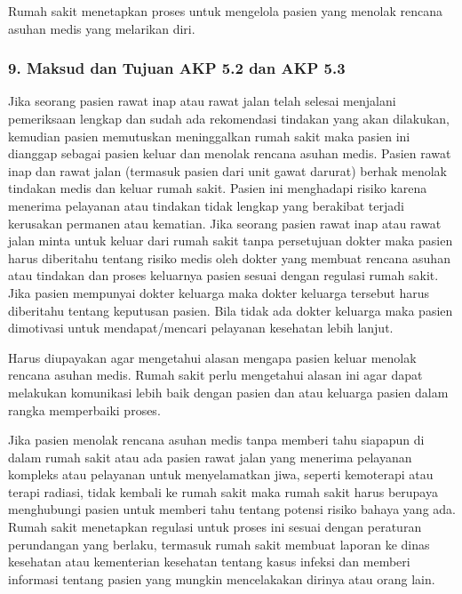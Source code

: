 \documentclass[
]{book}
\begin{document}
Rumah sakit menetapkan proses untuk mengelola pasien yang menolak rencana asuhan medis yang melarikan diri.

\hypertarget{maksud-dan-tujuan-akp-5.2-dan-akp-5.3}{%
\subsubsection*{9. Maksud dan Tujuan AKP 5.2 dan AKP 5.3}\label{maksud-dan-tujuan-akp-5.2-dan-akp-5.3}}

Jika seorang pasien rawat inap atau rawat jalan telah selesai menjalani pemeriksaan lengkap dan sudah ada rekomendasi tindakan yang akan dilakukan, kemudian pasien memutuskan meninggalkan rumah sakit maka pasien ini dianggap sebagai pasien keluar dan menolak rencana asuhan medis. Pasien rawat inap dan rawat jalan (termasuk pasien dari unit gawat darurat) berhak menolak tindakan medis dan keluar rumah sakit. Pasien ini menghadapi risiko karena menerima pelayanan atau tindakan tidak lengkap yang berakibat terjadi kerusakan permanen atau kematian. Jika seorang pasien rawat inap atau rawat jalan minta untuk keluar dari rumah sakit tanpa persetujuan dokter maka pasien harus diberitahu tentang risiko medis oleh dokter yang membuat rencana asuhan atau tindakan dan proses keluarnya pasien sesuai dengan regulasi rumah sakit. Jika pasien mempunyai dokter keluarga maka dokter keluarga tersebut harus diberitahu tentang keputusan pasien. Bila tidak ada dokter keluarga maka pasien dimotivasi untuk mendapat/mencari pelayanan kesehatan lebih lanjut.

Harus diupayakan agar mengetahui alasan mengapa pasien keluar menolak rencana asuhan medis. Rumah sakit perlu mengetahui alasan ini agar dapat melakukan komunikasi lebih baik dengan pasien dan atau keluarga pasien dalam rangka memperbaiki proses.

Jika pasien menolak rencana asuhan medis tanpa memberi tahu siapapun di dalam rumah sakit atau ada pasien rawat jalan yang menerima pelayanan kompleks atau pelayanan untuk menyelamatkan jiwa, seperti kemoterapi atau terapi radiasi, tidak kembali ke rumah sakit maka rumah sakit harus berupaya menghubungi pasien untuk memberi tahu tentang potensi risiko bahaya yang ada. Rumah sakit menetapkan regulasi untuk proses ini sesuai dengan peraturan perundangan yang berlaku, termasuk rumah sakit membuat laporan ke dinas kesehatan atau kementerian kesehatan tentang kasus infeksi dan memberi informasi tentang pasien yang mungkin mencelakakan dirinya atau orang lain.
\end{document}
